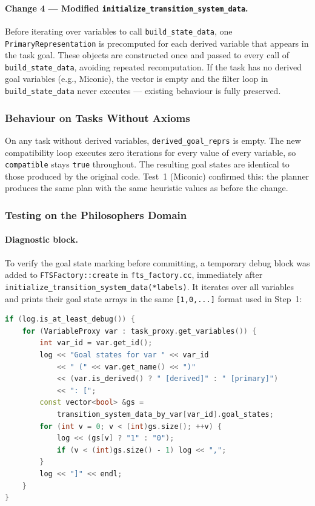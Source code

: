 \documentclass[11pt,a4paper]{article}
\begin{document}
\paragraph{Change 4 — Modified \texttt{initialize\_transition\_system\_data}.}
Before iterating over variables to call \texttt{build\_state\_data}, one
\texttt{PrimaryRepresentation} is precomputed for each derived variable that
appears in the task goal.  These objects are constructed once and passed to
every call of \texttt{build\_state\_data}, avoiding repeated recomputation.
If the task has no derived goal variables (e.g., Miconic), the vector is
empty and the filter loop in \texttt{build\_state\_data} never executes —
existing behaviour is fully preserved.

\subsubsection{Behaviour on Tasks Without Axioms}

On any task without derived variables, \texttt{derived\_goal\_reprs} is
empty.  The new compatibility loop executes zero iterations for every value
of every variable, so \texttt{compatible} stays \texttt{true} throughout.
The resulting goal states are identical to those produced by the original
code.  Test~1 (Miconic) confirmed this: the planner produces the same plan
with the same heuristic values as before the change.

\subsubsection{Testing on the Philosophers Domain}

\paragraph{Diagnostic block.}
To verify the goal state marking before committing, a temporary debug block
was added to \texttt{FTSFactory::create} in \texttt{fts\_factory.cc},
immediately after \texttt{initialize\_transition\_system\_data(*labels)}.
It iterates over all variables and prints their goal state arrays in the same
\texttt{[1,0,...]} format used in Step~1:

\begin{lstlisting}[language=C++]
if (log.is_at_least_debug()) {
    for (VariableProxy var : task_proxy.get_variables()) {
        int var_id = var.get_id();
        log << "Goal states for var " << var_id
            << " (" << var.get_name() << ")"
            << (var.is_derived() ? " [derived]" : " [primary]")
            << ": [";
        const vector<bool> &gs =
            transition_system_data_by_var[var_id].goal_states;
        for (int v = 0; v < (int)gs.size(); ++v) {
            log << (gs[v] ? "1" : "0");
            if (v < (int)gs.size() - 1) log << ",";
        }
        log << "]" << endl;
    }
}
\end{lstlisting}
\end{document}
